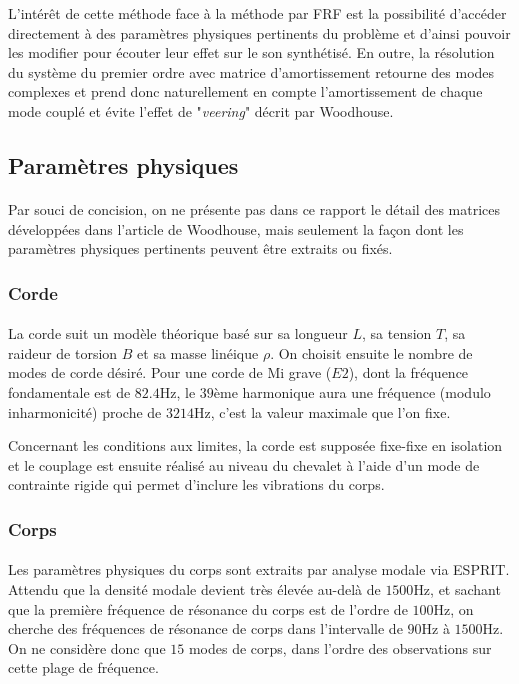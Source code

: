   L'intérêt de cette méthode face à la méthode par FRF est la possibilité
d'accéder directement à des paramètres physiques pertinents du problème et
d'ainsi pouvoir les modifier pour écouter leur effet sur le son synthétisé.
  En outre, la résolution du système du premier ordre avec matrice
d'amortissement retourne des modes complexes et prend donc naturellement en
compte l'amortissement de chaque mode couplé et évite l'effet de
"\emph{veering}" décrit par Woodhouse.

\subsection{Paramètres physiques}

\paragraph{}
  Par souci de concision, on ne présente pas dans ce rapport le détail des
matrices développées dans l'article de Woodhouse, mais seulement la façon dont
les paramètres physiques pertinents peuvent être extraits ou fixés.

\subsubsection{Corde}
  \paragraph{}
  
  La corde suit un modèle théorique basé sur sa longueur \( L \), sa tension
\( T \), sa raideur de torsion \( B \) et sa masse linéique \( \rho{} \).
  On choisit ensuite le nombre de modes de corde désiré.
  Pour une corde de Mi grave (\( E2 \)), dont la fréquence fondamentale est
de \( \si{82.4 \hertz}\), le \( 39 \)ème harmonique aura une fréquence (modulo 
inharmonicité) proche de \( \si{3214\hertz} \), c'est la valeur maximale que
l'on fixe.

  Concernant les conditions aux limites, la corde est supposée fixe-fixe
en isolation et le couplage est ensuite réalisé au niveau du chevalet à l'aide
d'un mode de contrainte rigide qui permet d'inclure les vibrations du corps.

\subsubsection{Corps}

  \paragraph{}
  Les paramètres physiques du corps sont extraits par analyse modale via ESPRIT.
Attendu que la densité modale devient très élevée au-delà de \( \si{1500\Hz} \),
et sachant que la première fréquence de résonance du corps est de l'ordre de
\( \si{100\Hz} \), on cherche des fréquences de résonance de corps dans
l'intervalle de \( \si{90\Hz} \) à \( \si{1500\Hz} \).
On ne considère donc que \( 15 \) modes de corps, dans l'ordre des observations
sur cette plage de fréquence.


